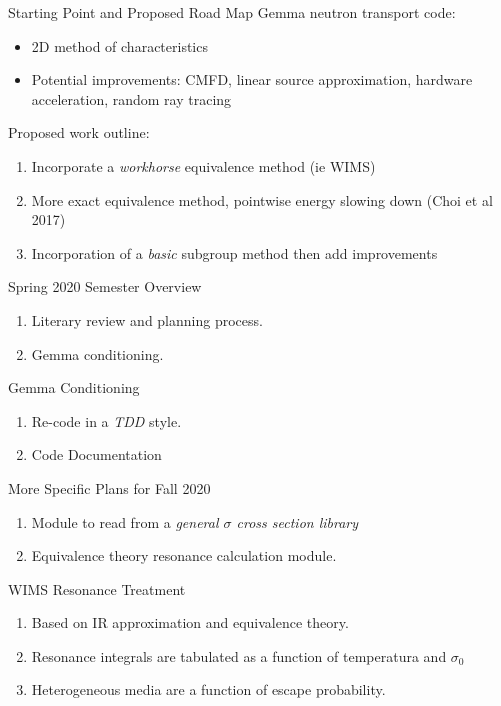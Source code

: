 \documentclass[sans,mathserif,aspectratio=169, 10pt]{beamer}
\begin{document}
\begin{frame}{Starting Point and Proposed Road Map}
Gemma neutron transport code:
\begin{itemize}[<+->]
\item 2D method of characteristics
\item Potential improvements: CMFD, linear source approximation, hardware acceleration, random ray tracing
\end{itemize}
\pause
Proposed work outline:
\begin{enumerate}[<+->]
\item Incorporate a \emph{workhorse} equivalence method (ie WIMS)
\item More exact equivalence method, pointwise energy slowing down (Choi et al 2017)
\item Incorporation of a \emph{basic} subgroup method then add improvements
\end{enumerate}
\end{frame}

\begin{frame}{Spring 2020 Semester Overview}
\begin{enumerate}[<+->]
\item Literary review and planning process.
\item Gemma conditioning.  
\end{enumerate}
\end{frame}

\begin{frame}{Gemma Conditioning}
\begin{enumerate}[<+->]
\item Re-code in a \emph{TDD} style.
\item Code Documentation
\end{enumerate}
\end{frame}

\begin{frame}{More Specific Plans for Fall 2020}
\begin{enumerate}[<+->]
\item Module to read from a \emph{general $\sigma$ cross section library}
\item Equivalence theory resonance calculation module. 
\end{enumerate}
\end{frame}

\begin{frame}{WIMS Resonance Treatment}
\begin{enumerate}[<+->]
\item Based on IR approximation and equivalence theory.
\item Resonance integrals are tabulated as a function of temperatura and $\sigma_0$
\item Heterogeneous media are a function of escape probability.
\end{enumerate}
\end{frame}
\end{document}
